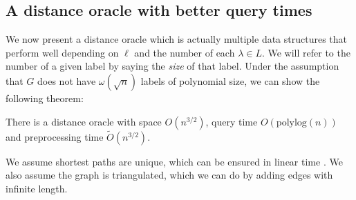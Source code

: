 \subsection{A distance oracle with better query times}\label{oracle2}
We now present a distance oracle which is actually multiple data structures that perform
well depending on $\ell$ and the number of each $\lambda\in L$. We will refer to the
number of a given label by saying the \textit{size} of that label.
Under the assumption that $G$ does not have $\omega(\sqrt{n})$ labels of polynomial size, we can show the following theorem:
\begin{thm}\label{thm2}
  There is a distance oracle with space $O(n^{3/2})$, query time $O(\text{polylog}(n))$ and
  preprocessing time $\tilde{O}(n^{3/2})$.
\end{thm}
We assume shortest paths are unique, which can be ensured
in linear time \cite{motwani2010randomized}\cite{mulmuley1987matching}. We also assume
the graph is triangulated, which we can do by adding edges with infinite length.\

